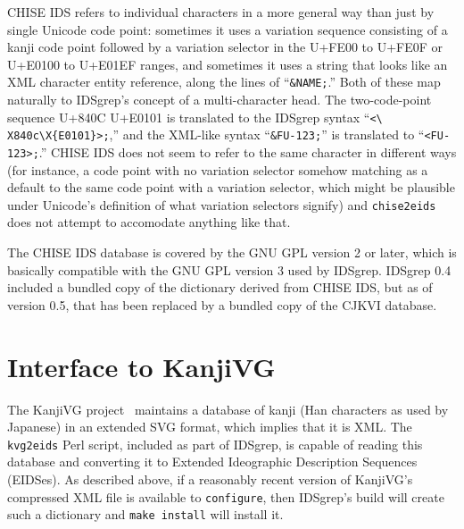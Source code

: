 \documentclass[twocolumn]{report}
\begin{document}
CHISE IDS refers to individual characters in a more general way than just by
single Unicode code point: sometimes it uses a variation sequence consisting
of a kanji code point followed by a variation selector in the U+FE00 to
U+FE0F or U+E0100 to U+E01EF ranges, and sometimes it uses a string that
looks like an XML character entity reference, along the lines of
``\texttt{\&NAME;}.'' Both of these map naturally to IDSgrep's concept of a
multi-character head.  The two-code-point sequence U+840C U+E0101 is
translated to the IDSgrep syntax ``\texttt{<\textbackslash%
X840c\textbackslash X\{E0101\}>;},'' and the XML-like syntax
``\texttt{\&FU-123;}'' is translated to ``\texttt{<FU-123>;}.'' CHISE IDS
does not seem to refer to the same character in different ways (for
instance, a code point with no variation selector somehow matching as a
default to the same code point with a variation selector, which might be
plausible under Unicode's definition of what variation selectors signify)
and \texttt{chise2eids} does not attempt to accomodate anything like that.

The CHISE IDS database is covered by the GNU GPL version 2 or later, which
is basically compatible with the GNU GPL version 3 used by IDSgrep.  IDSgrep
0.4 included a bundled copy of the dictionary derived from CHISE IDS, but as
of version 0.5, that has been replaced by a bundled copy of the CJKVI
database.


\section{Interface to KanjiVG}

The KanjiVG project~\cite{KanjiVG} maintains a database of kanji (Han
characters as used by Japanese) in an extended SVG format, which implies
that it is XML.  The \texttt{kvg2eids} Perl script, included as part of
IDSgrep, is capable of reading this database and converting it to Extended
Ideographic Description Sequences (EIDSes).  As described above, if a
reasonably recent version of KanjiVG's compressed XML file is available to
\texttt{configure}, then IDSgrep's build will create such a dictionary and
\texttt{make install} will install it.
\end{document}

